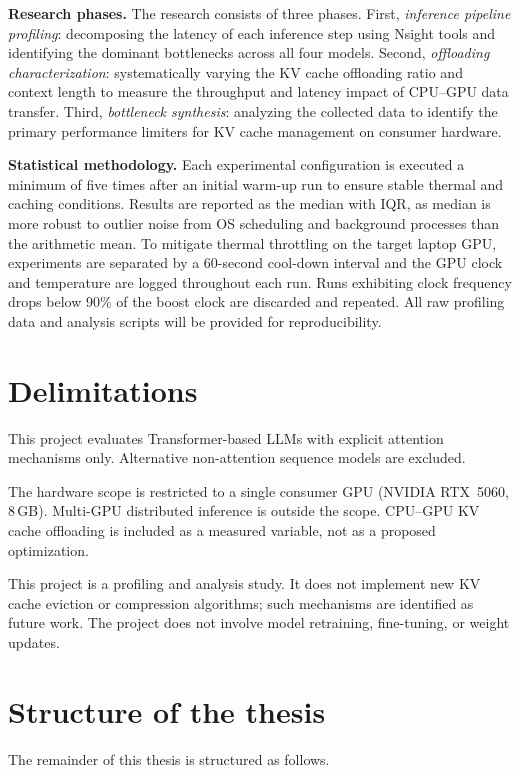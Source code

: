 \documentclass[
english,                 %
bibtex,                  %
]{kththesis}
\numberwithin{listing}{chapter}
\begin{document}
\textbf{Research phases.} The research consists of three phases. First, \textit{inference pipeline profiling}: decomposing the latency of each inference step using Nsight tools and identifying the dominant bottlenecks across all four models. Second, \textit{offloading characterization}: systematically varying the \gls{KV} cache offloading ratio and context length to measure the throughput and latency impact of \gls{CPU}--\gls{GPU} data transfer. Third, \textit{bottleneck synthesis}: analyzing the collected data to identify the primary performance limiters for \gls{KV} cache management on consumer hardware.

\textbf{Statistical methodology.} Each experimental configuration is executed a minimum of five times after an initial warm-up run to ensure stable thermal and caching conditions. Results are reported as the median with \gls{IQR}, as median is more robust to outlier noise from OS scheduling and background processes than the arithmetic mean. To mitigate thermal throttling on the target laptop \gls{GPU}, experiments are separated by a 60-second cool-down interval and the \gls{GPU} clock and temperature are logged throughout each run. Runs exhibiting clock frequency drops below 90\% of the boost clock are discarded and repeated. All raw profiling data and analysis scripts will be provided for reproducibility.


\section{Delimitations}
\label{sec:delimitations}
This project evaluates Transformer-based \glspl{LLM} with explicit attention mechanisms only. Alternative non-attention sequence models are excluded.

The hardware scope is restricted to a single consumer \gls{GPU} (NVIDIA RTX~5060, 8\,GB). Multi-\gls{GPU} distributed inference is outside the scope. \gls{CPU}--\gls{GPU} \gls{KV} cache offloading is included as a measured variable, not as a proposed optimization.

This project is a profiling and analysis study. It does not implement new \gls{KV} cache eviction or compression algorithms; such mechanisms are identified as future work. The project does not involve model retraining, fine-tuning, or weight updates.


\section{Structure of the thesis}
\label{sec:structure}
The remainder of this thesis is structured as follows. 
\end{document}
